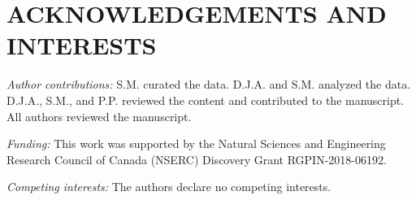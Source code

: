 \documentclass{IEEEoj-data}
\begin{document}
\section*{ACKNOWLEDGEMENTS AND INTERESTS}
\textit{Author contributions:} S.M. curated the data. D.J.A. and S.M. analyzed the data. D.J.A., S.M., and P.P. reviewed the content and contributed to the manuscript. All authors reviewed the manuscript.

\textit{Funding:} This work was supported by the Natural Sciences and Engineering Research Council of Canada (NSERC) Discovery Grant RGPIN-2018-06192.

\textit{Competing interests:} The authors declare no competing interests.

\balance


\end{document}
